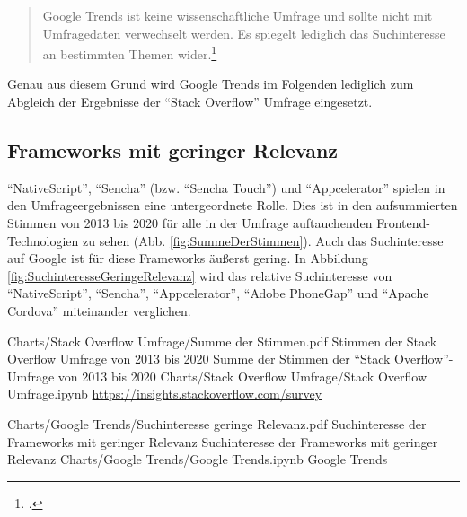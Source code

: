 \begin{quotation}
Google Trends ist keine wissenschaftliche Umfrage und sollte nicht mit Umfragedaten verwechselt werden.
Es spiegelt lediglich das Suchinteresse an bestimmten Themen wider.\footcite{GoogleTrendsHilfe}
\end{quotation}

Genau aus diesem Grund wird Google Trends im Folgenden lediglich zum Abgleich der Ergebnisse der \enquote{Stack Overflow} Umfrage eingesetzt.

\subsection{Frameworks mit geringer Relevanz}

\enquote{NativeScript}, \enquote{Sencha} (bzw.
\enquote{Sencha Touch}) und \enquote{Appcelerator} spielen in den Umfrageergebnissen eine untergeordnete Rolle.
Dies ist in den aufsummierten Stimmen von 2013 bis 2020 für alle in der Umfrage auftauchenden Frontend-Technologien zu sehen (Abb.
\ref{fig:SummeDerStimmen}).
Auch das Suchinteresse auf Google ist für diese Frameworks äußerst gering. 
In Abbildung \ref{fig:SuchinteresseGeringeRelevanz} wird das relative Suchinteresse von \enquote{NativeScript},
\enquote{Sencha}, \enquote{Appcelerator}, \enquote{Adobe PhoneGap} und \enquote{Apache Cordova} miteinander verglichen.


\begin{alexfigurewithnotebook}{Charts/Stack Overflow Umfrage/Summe der Stimmen.pdf}
	{Stimmen der Stack Overflow Umfrage von 2013 bis 2020}
	{Summe der Stimmen der \enquote{Stack Overflow}-Umfrage von 2013 bis 2020}
	{Charts/Stack Overflow Umfrage/Stack Overflow Umfrage.ipynb}
	{\url{https://insights.stackoverflow.com/survey}}

	\label{fig:SummeDerStimmen}

\end{alexfigurewithnotebook}
\begin{alexfigurewithnotebook}{Charts/Google Trends/Suchinteresse geringe Relevanz.pdf}
	{Suchinteresse der Frameworks mit geringer Relevanz}
	{Suchinteresse der Frameworks mit geringer Relevanz}
	{Charts/Google Trends/Google Trends.ipynb}
	{Google Trends}
	\label{fig:SuchinteresseGeringeRelevanz}

\end{alexfigurewithnotebook} 
\clearpage




